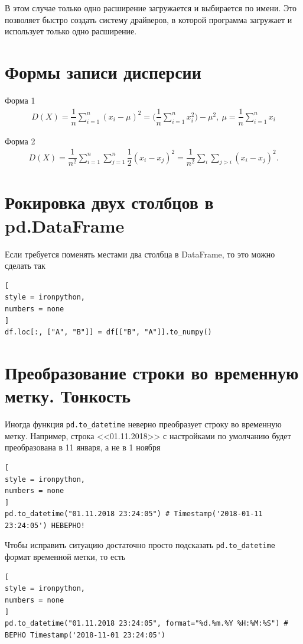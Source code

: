 \documentclass[%
	11pt,
	a4paper,
	utf8,
		]{article}
\begin{document}
В этом случае только одно расширение загружается и выбирается по имени. Это позволяет быстро создать систему драйверов, в которой программа загружает и использует только одно расширение.

\section{Формы записи дисперсии}

Форма 1
\begin{align*}
	D(X) = \dfrac{1}{n} \sum_{i=1}^{n} (x_i - \mu)^2 = \Bigg( \dfrac{1}{n} \sum_{i=1}^{n} x_i^2 \Bigg) - \mu^2, \ \mu = \dfrac{1}{n} \sum_{i=1}^{n} x_i
\end{align*}

Форма 2
\begin{align*}
	D(X) = \dfrac{1}{n^2} \sum_{i=1}^{n} \sum_{j=1}^{n} \dfrac{1}{2} (x_i - x_j)^2 = \dfrac{1}{n^2} \sum_{i} \sum_{j > i} (x_i - x_j)^2.
\end{align*}


\section{Рокировка двух столбцов в pd.DataFrame}

Если требуется поменять местами два столбца в DataFrame, то это можно сделать
так
\begin{lstlisting}[
style = ironpython,
numbers = none
]
df.loc[:, ["A", "B"]] = df[["B", "A"]].to_numpy()
\end{lstlisting}


\section{Преобразование строки во временную метку. Тонкость}

Иногда функция \texttt{pd.to\_datetime} неверно преобразует строку во временную метку. Например, строка <<01.11.2018>> с настройками по умолчанию будет преобразована в 11 января, а не в 1 ноября
\begin{lstlisting}[
style = ironpython,
numbers = none	
]
pd.to_datetime("01.11.2018 23:24:05") # Timestamp('2018-01-11 23:24:05') НЕВЕРНО!
\end{lstlisting}

Чтобы исправить ситуацию достаточно просто подсказать \texttt{pd.to\_datetime} формат временной метки, то есть
\begin{lstlisting}[
style = ironpython,
numbers = none	
]
pd.to_datetime("01.11.2018 23:24:05", format="%d.%m.%Y %H:%M:%S") # ВЕРНО Timestamp('2018-11-01 23:24:05')
\end{lstlisting}
\end{document}
